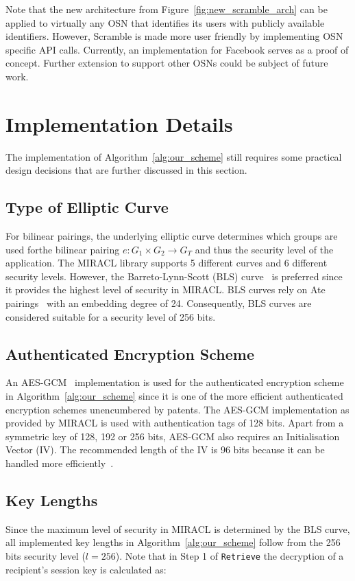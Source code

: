 Note that the new architecture from Figure~\ref{fig:new_scramble_arch} can be applied to virtually any OSN that identifies its users with publicly available identifiers. However, Scramble is made more user friendly by implementing OSN specific API calls. Currently, an implementation for Facebook serves as a proof of concept. Further extension to support other OSNs could be subject of future work.


\section{Implementation Details}
\label{sec:implementation_details}
The implementation of Algorithm~\ref{alg:our_scheme} still requires some practical design decisions that are further discussed in this section.

\subsection{Type of Elliptic Curve}
For bilinear pairings, the underlying elliptic curve determines which groups are used forthe bilinear pairing ${e: G_1 \times G_2 \rightarrow G_T}$ and thus the security level of the application. The MIRACL library supports 5 different curves and 6 different security levels. However, the Barreto-Lynn-Scott (BLS) curve~\cite{art:BarretoLS02} is preferred since it provides the highest level of security in MIRACL. BLS curves rely on Ate pairings~\cite{art:HessSV06} with an embedding degree of 24. Consequently, BLS curves are considered suitable for a security level of 256 bits.

\subsection{Authenticated Encryption Scheme}
An AES-GCM~\cite{art:McGrewV04} implementation is used for the authenticated encryption scheme in Algorithm~\ref{alg:our_scheme} since it is one of the more efficient authenticated encryption schemes unencumbered by patents. The AES-GCM implementation as provided by MIRACL is used with authentication tags of 128 bits. Apart from a symmetric key of 128, 192 or 256 bits, AES-GCM also requires an Initialisation Vector (IV). The recommended length of the IV is 96 bits because it can be handled more efficiently~\cite{rfc5084}.

\subsection{Key Lengths}
Since the maximum level of security in MIRACL is determined by the BLS curve, all implemented key lengths in Algorithm~\ref{alg:our_scheme} follow from the 256 bits security level ($l=256$). Note that in Step 1 of \texttt{Retrieve} the decryption of a recipient's session key is calculated as: 


